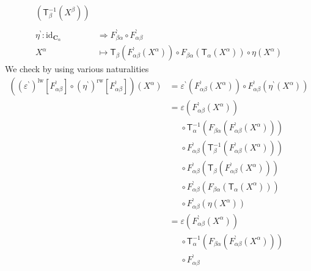 \begin{prf}
\begin{enumerate}
\begin{align*}
  \left(
    \mathsf{T}_{\beta}^{-1}(X^{\beta})
  \right)
  \\\\
  \eta^{\backprime}
  \colon
  \mathrm{id}_{\mathbf{C}_{\alpha}}
  &\Rightarrow
  F_{\beta\alpha}^{\backprime}
  \circ
  F_{\alpha\beta}^{\backprime}
  \\
  X^{\alpha}
  &\mapsto
  \mathsf{T}_{\beta}
  \left(
    F_{\alpha\beta}^{\backprime}(X^{\alpha})
  \right)
  \circ
  F_{\beta\alpha}
  \left(
    \mathsf{T}_{\alpha}(X^{\alpha})
  \right)
  \circ
  \eta(X^{\alpha})
\end{align*}
We check by using various naturalities
\begin{align*}
  \left(
    (\varepsilon^{\backprime})^{\textrm{lw}}[F_{\alpha\beta}^{\backprime}]
    \circ
    (\eta^{\backprime})^{\textrm{rw}}[F_{\alpha\beta}^{\backprime}]
  \right)
  (X^{\alpha})
  &=
  \varepsilon^{\backprime}
  \left(
    F_{\alpha\beta}^{\backprime}(X^{\alpha})
  \right)
  \circ
  F_{\alpha\beta}^{\backprime}
  \left(
    \eta^{\backprime}(X^{\alpha})
  \right)
  \\
  &=
  \varepsilon
  \left(
    F_{\alpha\beta}^{\backprime}(X^{\alpha})
  \right)
  \\
  &\phantom{=}
  \circ
  \mathsf{T}_{\alpha}^{-1}
  \left(
    F_{\beta\alpha}
    \left(
      F_{\alpha\beta}^{\backprime}(X^{\alpha})
    \right)
  \right)
  \\
  &\phantom{=}
  \circ
  F_{\alpha\beta}^{\backprime}
  \left(
    \mathsf{T}_{\beta}^{-1}
    \left(
      F_{\alpha\beta}^{\backprime}(X^{\alpha})
    \right)
  \right)
  \\
  &\phantom{=}
  \circ
  F_{\alpha\beta}^{\backprime}
  \left(
    \mathsf{T}_{\beta}
    \left(
      F_{\alpha\beta}^{\backprime}(X^{\alpha})
    \right)
  \right)
  \\
  &\phantom{=}
  \circ
  F_{\alpha\beta}^{\backprime}
  \left(
    F_{\beta\alpha}
    \left(
      \mathsf{T}_{\alpha}(X^{\alpha})
    \right)
  \right)
  \\
  &\phantom{=}
  \circ
  F_{\alpha\beta}^{\backprime}
  \left(
    \eta(X^{\alpha})
  \right)
  \\
  &=
  \varepsilon
  \left(
    F_{\alpha\beta}^{\backprime}(X^{\alpha})
  \right)
  \\
  &\phantom{=}
  \circ
  \mathsf{T}_{\alpha}^{-1}
  \left(
    F_{\beta\alpha}
    \left(
      F_{\alpha\beta}^{\backprime}(X^{\alpha})
    \right)
  \right)
  \\
  &\phantom{=}
  \circ
  F_{\alpha\beta}^{\backprime}

\end{align*}
\end{enumerate}
\end{prf}
